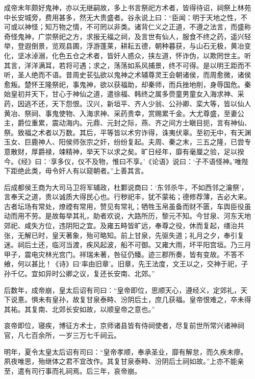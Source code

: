 \documentclass[12pt,UTF8]{ctexbook}
\begin{document}
成帝末年颇好鬼神，亦以无继嗣故，多上书言祭祀方术者，皆得待诏，祠祭上林苑中长安城旁，费用甚多，然无大贵盛者。谷永说上曰：“臣闻：明于天地之性，不可或以神怪；知万物之情，不可罔以非类。诸背仁义之正道，不遵之法言，而盛称奇怪鬼神，广崇祭祀之方，求报无福之祠，及言世有仙人，服食不终之药，遥兴轻举，登遐倒景，览观县圃，浮游蓬莱，耕耘五德，朝种暮获，与山石无极，黄冶变化，坚冰淖溺，化色五仓之术者，皆奸人惑众，挟左道，怀诈伪，以欺罔世主。听其言，洋洋满耳，若将可遇；求之，荡荡如系风捕景，终不可得。是以明王距而不听，圣人绝而不语。昔周史苌弘欲以鬼神之术辅尊灵王会朝诸侯，而周愈微，诸侯愈叛。楚怀王隆祭祀，事鬼神，欲以获福助，却秦师，而兵挫地削，身辱国危。秦始皇初并天下，甘心于神仙之道，遣徐福、韩终之属多赍童男童女入海求神、采药，因逃不还，天下怨恨。汉兴，新垣平、齐人少翁、公孙卿、栾大等，皆以仙人黄冶、祭祠、事鬼使物、入海求神、采药贵幸，赏赐累千金。大尤尊盛，至妻公主，爵位重累，震动海内。元鼎、元封之际，燕、齐之间方士瞋目扼，言有神仙、祭。致福之术者以万数。其后，平等皆以术穷诈得，诛夷伏辜。至初无中，有天渊玉女、巨鹿神人、阳侯师张宗之奸，纷纷复起。夫周、秦之末，三五之隆，已尝专意散财，厚爵禄，竦精神，举天下以求之矣。旷日经年，靡有毫厘之验，足以揆今。《经》曰：‘享多仪，仪不及物，惟曰不享。’《论语》说曰：‘子不语怪神。’唯陛下距绝此类，毋令奸人有以窥朝者。”上善其言。



后成都侯王商为大司马卫将军辅政，杜鄴说商曰：‘东邻杀牛，不如西邻之瀹祭’，言奉天之道，贵以诚质大得民心也。行秽祀丰，犹不蒙祐；德修荐薄，吉必大来。古者坛场有常处，燎禋有常用，赞见有常礼；牺牲玉帛虽备而财不匮，车舆臣役虽动而用不劳。是故每举其礼，助者欢说，大路所历，黎元不知。今甘泉、河东天地郊祀、咸失方位，违阴阳之宜。及雍五畤皆旷远，奉尊之役，休而复起，缮治共张，无解已时，皇天著象，殆可略知。前上甘泉，先驱失道；礼月之夕，奉引复迷。祠后土还，临河当渡，疾风起波，船不可御。又雍大雨，坏平阳宫垣。乃三月甲子，震电灾林光宫门。祥瑞未著，咎征仍臻。迹三郡所奏，皆有变故。不答不飨，何以甚比！《诗》曰‘率由旧章’。旧章，先王法度，文王以之，交神于祀，子孙千亿。宜如异时公卿之议，复还长安南、北郊。”



后数年，成帝崩，皇太后诏有司曰：“皇帝即位，思顺天心，遵经义，定郊礼，天下说憙。惧未有皇孙，故复甘泉泰畤、汾阴后土，庶几获福。皇帝恨难之，卒未得其祐。其复南、北郊长安如故，以顺皇帝之意也。”



哀帝即位，寝疾，博征方术士，京师诸县皆有侍祠使者，尽复前世所常兴诸神祠官，凡七百余所，一岁三万七千祠云。



明年，夏令太皇太后诏有司曰：“皇帝孝顺，奉承圣业，靡有解怠，而久疾未瘳。夙夜唯思，殆继体之君不宜改作。其复甘泉泰畤、汾阴后土祠如故。”上亦不能亲至，遣有司行事而礼祠焉。后三年，哀帝崩。
\end{document}
